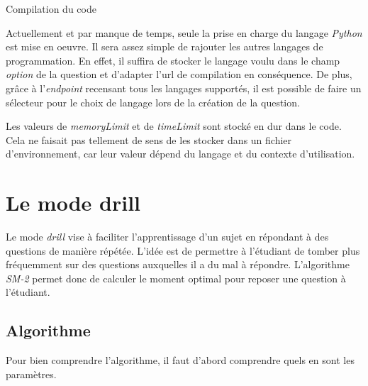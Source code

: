 \begin{listing}[H]
    \inputminted{php}{assets/code/codeCompilation.php}
    \caption{Compilation du code}
\end{listing}

Actuellement et par manque de temps, seule la prise en charge du langage \emph{Python} est mise en oeuvre. Il sera assez simple de rajouter les autres langages de programmation. En effet, il suffira de stocker le langage voulu dans le champ \emph{option} de la question et d'adapter l'url de compilation en conséquence. De plus, grâce à l'\emph{endpoint} recensant tous les langages supportés, il est possible de faire un sélecteur pour le choix de langage lors de la création de la question.

Les valeurs de \emph{memoryLimit} et de \emph{timeLimit} sont stocké en dur dans le code. Cela ne faisait pas tellement de sens de les stocker dans un fichier d'environnement, car leur valeur dépend du langage et du contexte d'utilisation.


\section{Le mode drill}
Le mode \emph{drill} vise à faciliter l'apprentissage d'un sujet en répondant à des questions de manière répétée. L'idée est de permettre à l'étudiant de tomber plus fréquemment sur  des questions auxquelles il a du mal à répondre. L'algorithme \emph{SM-2} permet donc de calculer le moment optimal pour reposer une question à l'étudiant.

\subsection{Algorithme}
Pour bien comprendre l'algorithme, il faut d'abord comprendre quels en sont les paramètres.

